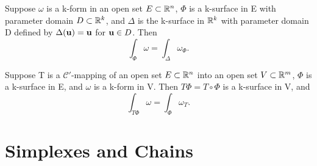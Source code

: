 \begin{theorem}
  \label{thm:chap10:integration_pullback1}
  Suppose $\omega$ is a k-form in an open set $E \subset \mathbb{R}^n$,
  $\Phi$ is a k-surface in E with parameter domain $D \subset \mathbb{R}^k$,
  and $\Delta$ is the k-surface in $\mathbb{R}^k$ with parameter domain D
  defined by $\Delta(\mathbf{u}) = \mathbf{u}$ for $\mathbf{u} \in D$. Then
  \[
    \int_\Phi \omega = \int_\Delta \omega_\Phi.
  \]
\end{theorem}

\begin{theorem}
  \label{thm:chap10:integration_pullback2}
  Suppose T is a $\mathcal{C}'$-mapping of an open set $E \subset
  \mathbb{R}^n$ into an open set $V \subset \mathbb{R}^m$, $\Phi$ is a k-surface in
  E, and $\omega$ is a k-form in V. Then $T\Phi = T \circ \Phi$ is a
  k-surface in V, and
  \[
    \int_{T\Phi} \omega = \int_\Phi \omega_T.
  \]
\end{theorem}



\section{Simplexes and Chains}

